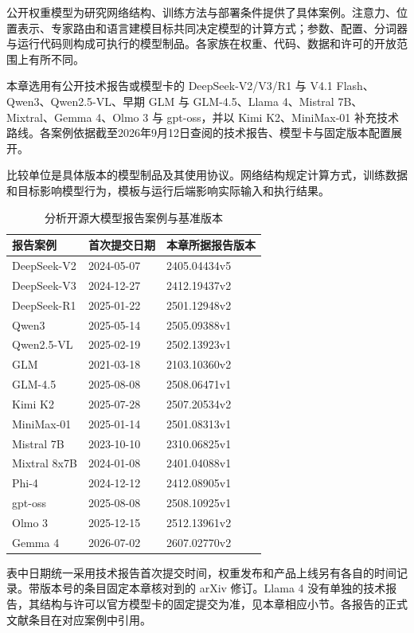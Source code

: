 \documentclass[../textbook.tex]{subfiles}
\begin{document}
\fi
{}

公开权重模型为研究网络结构、训练方法与部署条件提供了具体案例。注意力、位置表示、专家路由和语言建模目标共同决定模型的计算方式；参数、配置、分词器与运行代码则构成可执行的模型制品。各家族在权重、代码、数据和许可的开放范围上有所不同。

本章选用有公开技术报告或模型卡的 DeepSeek-V2/V3/R1 与 V4.1 Flash、Qwen3、Qwen2.5-VL、早期 GLM 与 GLM-4.5、Llama 4、Mistral 7B、Mixtral、Gemma 4、Olmo 3 与 gpt-oss，并以 Kimi K2、MiniMax-01 补充技术路线。各案例依据截至2026年9月12日查阅的技术报告、模型卡与固定版本配置展开。

\begin{note}[比较模型的基本单位]
比较单位是具体版本的模型制品及其使用协议。网络结构规定计算方式，训练数据和目标影响模型行为，模板与运行后端影响实际输入和执行结果。
\end{note}

\begin{table}[htbp]
\centering
\caption{分析开源大模型报告案例与基准版本}\label{tab:open-case-dates}
\begin{tabular}{lll}
\toprule 报告案例 & 首次提交日期 & 本章所据报告版本\\\midrule
DeepSeek-V2 & 2024-05-07 & 2405.04434v5\\
DeepSeek-V3 & 2024-12-27 & 2412.19437v2\\
DeepSeek-R1 & 2025-01-22 & 2501.12948v2\\
Qwen3 & 2025-05-14 & 2505.09388v1\\
Qwen2.5-VL & 2025-02-19 & 2502.13923v1\\
GLM & 2021-03-18 & 2103.10360v2\\
GLM-4.5 & 2025-08-08 & 2508.06471v1\\
Kimi K2 & 2025-07-28 & 2507.20534v2\\
MiniMax-01 & 2025-01-14 & 2501.08313v1\\
Mistral 7B & 2023-10-10 & 2310.06825v1\\
Mixtral 8x7B & 2024-01-08 & 2401.04088v1\\
Phi-4 & 2024-12-12 & 2412.08905v1\\
gpt-oss & 2025-08-08 & 2508.10925v1\\
Olmo 3 & 2025-12-15 & 2512.13961v2\\
Gemma 4 & 2026-07-02 & 2607.02770v2\\
\bottomrule
\end{tabular}
\end{table}
表中日期统一采用技术报告首次提交时间，权重发布和产品上线另有各自的时间记录。带版本号的条目固定本章核对到的 arXiv 修订。Llama 4 没有单独的技术报告，其结构与许可以官方模型卡的固定提交为准，见本章相应小节。各报告的正式文献条目在对应案例中引用。
\end{document}
